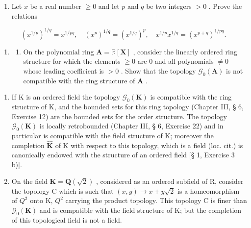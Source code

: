 \BourbakiExerciseGroup

\begin{enumerate}
\def\labelenumi{\arabic{enumi})}
\tightlist
\item
  Let \(x\) be a real number \(\geqslant 0\) and let \(p\) and \(q\) be two integers \(> 0\) . Prove the relations
\end{enumerate}

\[
(x ^ {1 / p}) ^ {1 / q} = x ^ {1 / p q}, \quad (x ^ {p}) ^ {1 / q} = (x ^ {1 / q}) ^ {p}, \quad x ^ {1 / p} x ^ {1 / q} = (x ^ {p + q}) ^ {1 / p q}.
\]

\begin{enumerate}
\def\labelenumi{\arabic{enumi})}
\setcounter{enumi}{1}
\tightlist
\item
  \begin{enumerate}
  \def\labelenumii{\alph{enumii})}
  \tightlist
  \item
    On the polynomial ring \(\mathbf{A} = \mathbb{R}[\mathbf{X}]\) , consider the linearly ordered ring structure for which the elements \(\geqslant 0\) are \(0\) and all polynomials \(\neq 0\) whose leading coefficient is \(>0\) . Show that the topology \(\mathcal{G}_{0}(\mathbf{A})\) is not compatible with the ring structure of \(\mathbf{A}\) .
  \end{enumerate}
\end{enumerate}

\begin{enumerate}
\def\labelenumi{\alph{enumi})}
\setcounter{enumi}{1}
\item
  If K is an ordered field the topology \(\mathcal{G}_{0}(\mathbf{K})\) is compatible with the ring structure of K, and the bounded sets for this ring topology (Chapter III, § 6, Exercise 12) are the bounded sets for the order structure. The topology \(\mathcal{G}_{0}(\mathbf{K})\) is locally retrobounded (Chapter III, § 6, Exercise 22) and in particular is compatible with the field structure of K; moreover the completion \(\hat{\mathbf{K}}\) of K with respect to this topology, which is a field (loc. cit.) is canonically endowed with the structure of an ordered field {[}§ 1, Exercise 3 b){]}.
\item
  On the field \(\mathbf{K} = \mathbf{Q}(\sqrt{2})\) , considered as an ordered subfield of R, consider the topology C which is such that \((x, y) \to x + y\sqrt{2}\) is a homeomorphism of \(Q^{2}\) onto K, \(Q^{2}\) carrying the product topology. This topology C is finer than \(\mathcal{G}_{0}(\mathbf{K})\) and is compatible with the field structure of K; but the completion of this topological field is not a field.
\end{enumerate}

